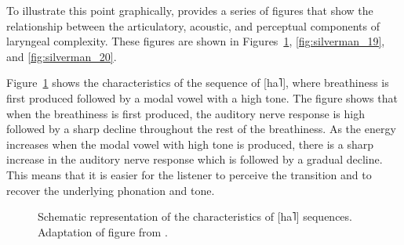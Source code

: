 To illustrate this point graphically, \citeauthor{silvermanLaryngealComplexityOtomanguean1997} provides a series of figures that show the relationship between the articulatory, acoustic, and perceptual components of laryngeal complexity. These figures are shown in Figures~\ref{fig:silverman_18}, \ref{fig:silverman_19}, and \ref{fig:silverman_20}. 

Figure~\ref{fig:silverman_18} shows the characteristics of the sequence of [ha˥], where breathiness is first produced followed by a modal vowel with a high tone. The figure shows that when the breathiness is first produced, the auditory nerve response is high followed by a sharp decline throughout the rest of the breathiness. As the energy increases when the modal vowel with high tone is produced, there is a sharp increase in the auditory nerve response which is followed by a gradual decline. This means that it is easier for the listener to perceive the transition and to recover the underlying phonation and tone.
\begin{figure}[h!]
    \centering
    \caption{Schematic representation of the characteristics of [ha˥] sequences. Adaptation of figure from \citet{silvermanLaryngealComplexityOtomanguean1997}.}
    \label{fig:silverman_18}
\end{figure}

